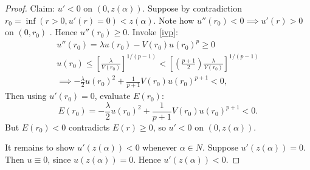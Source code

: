 \begin{lemma}
\begin{proof}
Claim: $u'<0$ on $(0,z(\alpha))$. Suppose by contradiction $r_0=\inf(r>0,u'(r)=0)<z(\alpha)$. Note how $u''(r_0)<0\implies u'(r)>0$ on $(0,r_0)$ \Lightning. Hence $u''(r_0)\geq0$. Invoke \ref{ivp}:
\begin{gather*}u''(r_0)=\lambda u(r_0)-V(r_0)u(r_0)^p\geq0\\u(r_0)\leq\left[\frac{\lambda}{V(r_0)}\right]^{1/(p-1)}<\left[\left(\frac{p+1}{2}\right)\frac{\lambda}{V(r_0)}\right]^{1/(p-1)}\\
\implies-\frac{\lambda}{2}u(r_0)^2+\frac{1}{p+1}V(r_0)u(r_0)^{p+1}<0,\end{gather*}Then using $u'(r_0)=0$, evaluate $E(r_0)$: $$E(r_0)=-\frac{\lambda}{2}u(r_0)^2+\frac{1}{p+1}V(r_0)u(r_0)^{p+1}<0.$$ %
But $E(r_0)<0$ contradicts $E(r)\geq0$, so $u'<0$ on $(0,z(\alpha))$.

It remains to show $u'(z(\alpha))<0$ whenever $\alpha\in N$. Suppose $u'(z(\alpha))=0$. Then $u\equiv0$, since $u(z(\alpha))=0$. Hence $u'(z(\alpha))<0$.

\end{proof}
\end{lemma}
